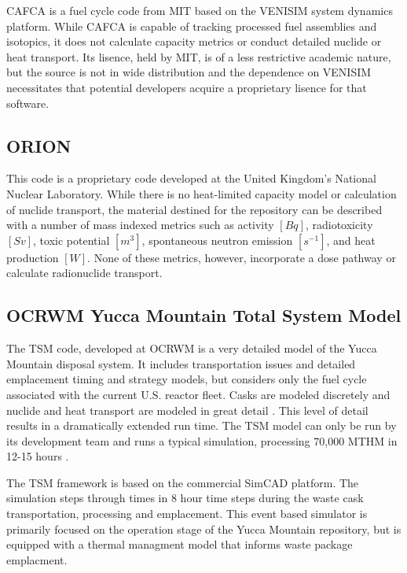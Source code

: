 \gls{CAFCA} is a fuel cycle code from \gls{MIT} based on the VENISIM system 
dynamics platform. While \gls{CAFCA} is 
capable of tracking processed fuel assemblies and isotopics, it does not 
calculate capacity metrics or conduct detailed nuclide or heat transport. Its 
lisence, held by \gls{MIT}, is of a less restrictive academic nature, but the 
source is not in wide distribution and the dependence on VENISIM necessitates 
that potential developers acquire a proprietary lisence for that software. 

\subsection{ORION} 

This code is a proprietary code developed at the United
Kingdom's National Nuclear Laboratory. While there is no heat-limited capacity 
model or calculation of nuclide transport, the material destined for the 
repository can be described with a number of mass indexed metrics such as activity 
$[Bq]$, radiotoxicity $[Sv]$,  toxic potential $[m^3]$, spontaneous neutron emission 
$[s^{-1}]$, and heat production $[W]$. None of these metrics, however, 
incorporate a dose pathway or calculate radionuclide transport. 



\subsection{OCRWM Yucca Mountain Total System Model}

The \gls{TSM} code, 
developed at \gls{OCRWM} is a very detailed model of the Yucca Mountain disposal 
system. It includes transportation issues and detailed emplacement timing and 
strategy models, but considers only the fuel cycle associated with the current  
U.S.  reactor fleet. Casks are modeled discretely and nuclide and heat transport 
are modeled in great detail .  This level of detail 
results in a dramatically extended run time. The \gls{TSM} model can only be 
run by its development team and runs a typical simulation, processing 70,000 
MTHM in 12-15 hours \cite{turner_discrete_2010}. 

The TSM framework is based on the commercial SimCAD platform. The simulation 
steps through times in 8 hour time steps during the waste cask transportation, 
processing and emplacement. This event based simulator is primarily focused on 
the operation stage of the Yucca Mountain repository, but is equipped with a 
thermal managment model that informs waste package emplacment.



